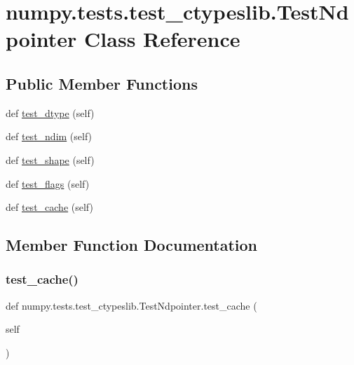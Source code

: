 \hypertarget{classnumpy_1_1tests_1_1test__ctypeslib_1_1TestNdpointer}{}\section{numpy.\+tests.\+test\+\_\+ctypeslib.\+Test\+Ndpointer Class Reference}
\label{classnumpy_1_1tests_1_1test__ctypeslib_1_1TestNdpointer}
\subsection*{Public Member Functions}
\begin{DoxyCompactItemize}
\item 
def \hyperlink{classnumpy_1_1tests_1_1test__ctypeslib_1_1TestNdpointer_a9e0e151f1e591d82ccb6ab892d706538}{test\+\_\+dtype} (self)
\item 
def \hyperlink{classnumpy_1_1tests_1_1test__ctypeslib_1_1TestNdpointer_ad6cb79ad04725d0701f2ab9c63b093f1}{test\+\_\+ndim} (self)
\item 
def \hyperlink{classnumpy_1_1tests_1_1test__ctypeslib_1_1TestNdpointer_a1e7ece877caab0b954da32e61e6d1b67}{test\+\_\+shape} (self)
\item 
def \hyperlink{classnumpy_1_1tests_1_1test__ctypeslib_1_1TestNdpointer_a45f563fcf343a7074d8f1e0303a7620a}{test\+\_\+flags} (self)
\item 
def \hyperlink{classnumpy_1_1tests_1_1test__ctypeslib_1_1TestNdpointer_a0f8fe47d2336ce510d25351f8e556ada}{test\+\_\+cache} (self)
\end{DoxyCompactItemize}


\subsection{Member Function Documentation}
\mbox{\label{classnumpy_1_1tests_1_1test__ctypeslib_1_1TestNdpointer_a0f8fe47d2336ce510d25351f8e556ada}} 
\subsubsection{\texorpdfstring{test\+\_\+cache()}{test\_cache()}}
{\footnotesize\ttfamily def numpy.\+tests.\+test\+\_\+ctypeslib.\+Test\+Ndpointer.\+test\+\_\+cache (\begin{DoxyParamCaption}\item[{}]{self }\end{DoxyParamCaption})}

